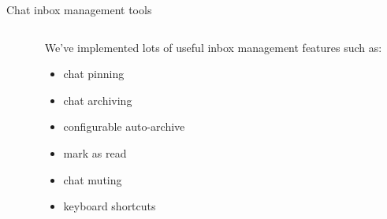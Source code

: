 \documentclass{beeper}
\begin{document}
\begin{frame}{Chat inbox management tools}
\begin{columns}
\begin{column}{0.3\textwidth}
        \end{column}
        \begin{column}{0.7\textwidth}
            We've implemented lots of useful inbox management features such as:
            \begin{itemize}
                \item chat pinning
                \item chat archiving
                \item configurable auto-archive
                \item mark as read
                \item chat muting
                \item keyboard shortcuts
            \end{itemize}
        \end{column}
    \end{columns}
\end{frame}
\end{document}

